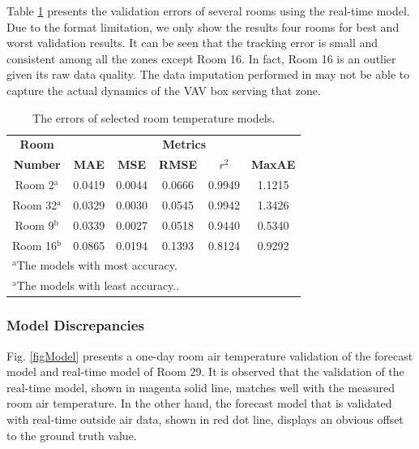 \documentclass[conference]{IEEEtran}
\begin{document}
Table \ref{tabModel} presents the validation errors of several rooms using the real-time model. Due to the format limitation, we only show the results four rooms for best and worst validation results. It can be seen that the tracking error is small and consistent among all the zones except Room 16. In fact, Room 16 is an outlier given its raw data quality. The data imputation performed in \cite{liang2014modeling} may not be able to capture the actual dynamics of the VAV box serving that zone.

\begin{table}[htbp]
\caption{The errors of selected room temperature models.}
\begin{center}
\begin{tabular}{|c|c|c|c|c|c|}
\hline
\textbf{Room} &\multicolumn{5}{|c|}{\textbf{Metrics}} \\
\cline{2-6} 
\textbf{Number}&\textbf{MAE} & \textbf{MSE} & \textbf{RMSE} & $r^2$ & \textbf{MaxAE} \\
\hline
Room 2$^{\mathrm{a}}$ &  0.0419  &  0.0044  &  0.0666 &  0.9949  &  1.1215\\
Room 32$^{\mathrm{a}}$ & 0.0329  &  0.0030  &  0.0545  &  0.9942 &   1.3426\\
Room 9$^{\mathrm{b}}$ & 0.0339  & 0.0027  & 0.0518 &  0.9440  & 0.5340\\
Room 16$^{\mathrm{b}}$ & 0.0865 &  0.0194  & 0.1393  & 0.8124 & 0.9292 \\
\hline
\multicolumn{4}{l}{$^{\mathrm{a}}$The models with most accuracy.}\\
\multicolumn{4}{l}{$^{\mathrm{a}}$The models with least accuracy..}
\end{tabular}
\label{tabModel}
\end{center}
\end{table}

\subsubsection{Model Discrepancies} \label{discrepancy}

Fig. \ref{figModel} presents a one-day room air temperature validation of the forecast model and real-time model of Room 29. It is observed that the validation of the real-time model, shown in magenta solid line, matches well with the measured room air temperature. In the other hand, the forecast model that is validated with real-time outside air data, shown in red dot line, displays an obvious offset to the ground truth value.
\end{document}
